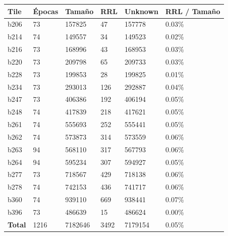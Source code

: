 \begin{table}[h]
\centering
\begin{tabular}{|l|l|l|l|l|l|}
\hline
\textbf{Tile}  & \textbf{Épocas} & \textbf{Tamaño} & \textbf{RRL} & \textbf{Unknown} & \textbf{RRL / Tamaño} \\ \hline
b206           & 73              & 157825          & 47           & 157778           & 0.03\%                \\ \hline
b214           & 74              & 149557          & 34           & 149523           & 0.02\%                \\ \hline
b216           & 73              & 168996          & 43           & 168953           & 0.03\%                \\ \hline
b220           & 73              & 209798          & 65           & 209733           & 0.03\%                \\ \hline
b228           & 73              & 199853          & 28           & 199825           & 0.01\%                \\ \hline
b234           & 73              & 293013          & 126          & 292887           & 0.04\%                \\ \hline
b247           & 73              & 406386          & 192          & 406194           & 0.05\%                \\ \hline
b248           & 74              & 417839          & 218          & 417621           & 0.05\%                \\ \hline
b261           & 74              & 555693          & 252          & 555441           & 0.05\%                \\ \hline
b262           & 74              & 573873          & 314          & 573559           & 0.06\%                \\ \hline
b263           & 94              & 568110          & 317          & 567793           & 0.06\%                \\ \hline
b264           & 94              & 595234          & 307          & 594927           & 0.05\%                \\ \hline
b277           & 73              & 718567          & 429          & 718138           & 0.06\%                \\ \hline
b278           & 74              & 742153          & 436          & 741717           & 0.06\%                \\ \hline
b360           & 74              & 939110          & 669          & 938441           & 0.07\%                \\ \hline
b396           & 73              & 486639          & 15           & 486624           & 0.00\%                \\ \hline
\textbf{Total} & 1216            & 7182646         & 3492         & 7179154          & 0.05\%                \\ \hline
\end{tabular}
\end{table}


